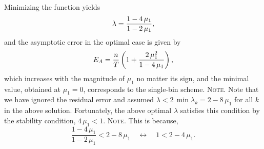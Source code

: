 \documentclass[reprint, floatfix]{revtex4-1}
\newcommand{\note}[1]{{\color{DarkGreen}\footnotesize \textsc{Note.} #1}}
\newcommand{\Err}{E}
\begin{document}
%
Minimizing the function yields
%
\begin{equation}
  \lambda
  =
  \frac{ 1 - 4 \, \mu_1 }
       { 1 - 2 \, \mu_1 }
  ,
\notag
\end{equation}
%
and the asymptotic error in the optimal case is given by
%
\begin{equation}
  \Err_A
  =
  \frac{n}{T}
  \left(
    1+ \frac{2 \, \mu_1^2}{1-4 \, \mu_1}
  \right)
  ,
\notag
\end{equation}
%
which
increases with the magnitude of $\mu_1$
no matter its sign,
and the minimal value, obtained at $\mu_1 = 0$,
corresponds to the single-bin scheme.
%
\note{Note that
we have ignored the residual error
and assumed $\lambda < 2 \, \min \lambda_k = 2 - 8 \, \mu_1$
for all $k$ in the above solution.
%
Fortunately,
the above optimal $\lambda$ %
satisfies this condition
by the stability condition,
$4 \, \mu_1 < 1$.
}%
\note{This is because,
$$
\frac{ 1 - 4 \, \mu_1 } { 1 - 2 \, \mu_1 } < 2 - 8 \, \mu_1
\quad \leftrightarrow \quad
1 < 2 - 4 \, \mu_1.
$$
}%
\end{document}
